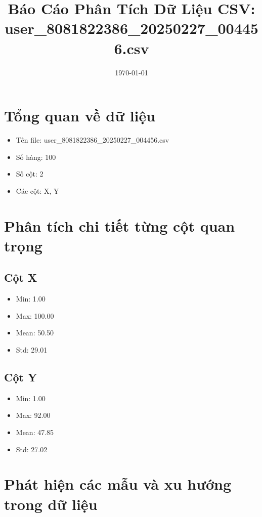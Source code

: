 \documentclass[12pt]{article}
\title{Báo Cáo Phân Tích Dữ Liệu CSV: user\_8081822386\_20250227\_004456.csv}
\author{}
\date{\today}
\begin{document}
\maketitle
\thispagestyle{empty}

\newpage
\tableofcontents
\newpage

\section{Tổng quan về dữ liệu}

\begin{itemize}
    \item Tên file: user\_8081822386\_20250227\_004456.csv
    \item Số hàng: 100
    \item Số cột: 2
    \item Các cột: X, Y
\end{itemize}

\section{Phân tích chi tiết từng cột quan trọng}

\subsection{Cột X}

\begin{itemize}
    \item Min: 1.00
    \item Max: 100.00
    \item Mean: 50.50
    \item Std: 29.01
\end{itemize}

\subsection{Cột Y}

\begin{itemize}
    \item Min: 1.00
    \item Max: 92.00
    \item Mean: 47.85
    \item Std: 27.02
\end{itemize}

\section{Phát hiện các mẫu và xu hướng trong dữ liệu}
\end{document}
